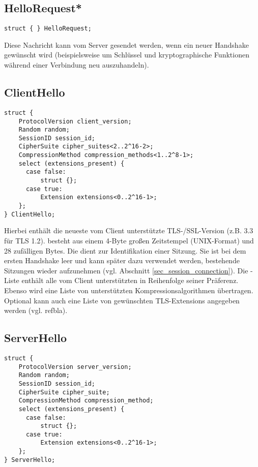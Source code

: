 \subsection*{HelloRequest*}

\begin{lstlisting}
struct { } HelloRequest;
\end{lstlisting}

Diese Nachricht kann vom Server gesendet werden, wenn ein neuer Handshake gewünscht wird (beispielsweise um Schlüssel und kryptographische Funktionen während einer Verbindung neu auszuhandeln).

\subsection*{ClientHello}

\begin{lstlisting}
struct {
	ProtocolVersion client_version;
	Random random;
	SessionID session_id;
	CipherSuite cipher_suites<2..2^16-2>;
	CompressionMethod compression_methods<1..2^8-1>;
	select (extensions_present) {
	  case false:
	      struct {};
	  case true:
	      Extension extensions<0..2^16-1>;
	};
} ClientHello;
\end{lstlisting}

Hierbei enthält  die neueste vom Client unterstützte TLS-/SSL-Version (z.B. 3.3 für TLS 1.2). 
 besteht aus einem 4-Byte großen Zeitstempel (UNIX-Format) und 28 zufälligen Bytes. 
Die  dient zur Identifikation einer Sitzung. Sie ist bei dem ersten Handshake leer und kann später dazu verwendet werden, bestehende Sitzungen wieder aufzunehmen (vgl. Abschnitt \ref{sec_session_connection}). 
Die \ciphersuite{}-Liste enthält alle vom Client unterstützten \ciphersuites{} in Reihenfolge seiner Präferenz. 
Ebenso wird eine Liste von unterstützten Kompressionsalgorithmen übertragen. 
Optional kann auch eine Liste von gewünschten TLS-Extensions angegeben werden (vgl. refbla).

\subsection*{ServerHello}

\begin{lstlisting}
struct {
	ProtocolVersion server_version;
	Random random;
	SessionID session_id;
	CipherSuite cipher_suite;
	CompressionMethod compression_method;
	select (extensions_present) {
	  case false:
	      struct {};
	  case true:
	      Extension extensions<0..2^16-1>;
	};
} ServerHello;
\end{lstlisting}

